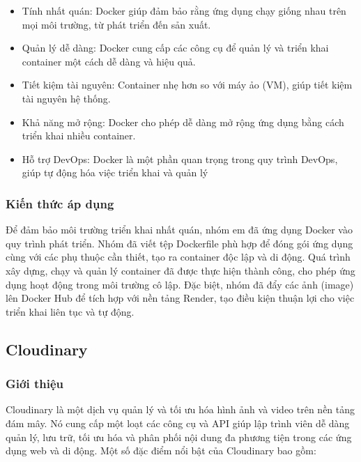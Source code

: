 \documentclass[../BTL.tex]{subfiles}
\begin{document}
\begin{itemize}
    \item Tính nhất quán: Docker giúp đảm bảo rằng ứng dụng chạy giống nhau trên mọi môi trường, từ phát triển đến sản xuất.
    \item Quản lý dễ dàng: Docker cung cấp các công cụ để quản lý và triển khai container một cách dễ dàng và hiệu quả.
    \item Tiết kiệm tài nguyên: Container nhẹ hơn so với máy ảo (VM), giúp tiết kiệm tài nguyên hệ thống.
    \item Khả năng mở rộng: Docker cho phép dễ dàng mở rộng ứng dụng bằng cách triển khai nhiều container.
    \item Hỗ trợ DevOps: Docker là một phần quan trọng trong quy trình DevOps, giúp tự động hóa việc triển khai và quản lý
\end{itemize}
\subsubsection{ Kiến thức áp dụng}
Để đảm bảo môi trường triển khai nhất quán, nhóm em đã ứng dụng Docker vào quy trình phát triển. Nhóm đã viết tệp Dockerfile phù hợp để đóng gói ứng dụng cùng với các phụ thuộc cần thiết, tạo ra container độc lập và di động. Quá trình xây dựng, chạy và quản lý container đã được thực hiện thành công, cho phép ứng dụng hoạt động trong môi trường cô lập. Đặc biệt, nhóm đã đẩy các ảnh (image) lên Docker Hub để tích hợp với nền tảng Render, tạo điều kiện thuận lợi cho việc triển khai liên tục và tự động.
\subsection{Cloudinary}
\subsubsection{ Giới thiệu}
Cloudinary là một dịch vụ quản lý và tối ưu hóa hình ảnh và video trên nền tảng đám mây. Nó cung cấp một loạt các công cụ và API giúp lập trình viên dễ dàng quản lý, lưu trữ, tối ưu hóa và phân phối nội dung đa phương tiện trong các ứng dụng web và di động. Một số đặc điểm nổi bật của Cloudinary bao gồm:
\end{document}
